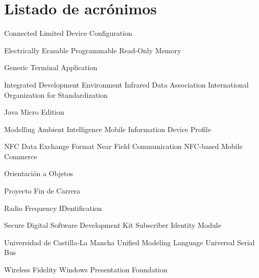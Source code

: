 
\chapter{Listado de acrónimos}

{\small
\begin{acronym}[XXXXXXXX]
      {Connected Limited Device Configuration}

    {Electrically Erasable Programmable Read-Only Memory}

       {Generic Terminal Application}

       {Integrated Development Environment}
      {Infrared Data Association}
       {International Organization for Standardization}

    {Java Micro Edition}

      {Modelling Ambient Intelligence}
      {Mobile Information Device Profile}

      {NFC Data Exchange Format}
       {Near Field Communication}
       {NFC-based Mobile Commerce}

        {Orientación a Objetos}

       {Proyecto Fin de Carrera}

      {Radio Frequency IDentification}

        {Secure Digital}
       {Software Development Kit}
       {Subscriber Identity Module}

      {Universidad de Castilla-La Mancha}
       {Unified Modeling Language}
       {Universal Serial Bus}

      {Wireless Fidelity}
       {Windows Presentation Foundation}
\end{acronym}
}




